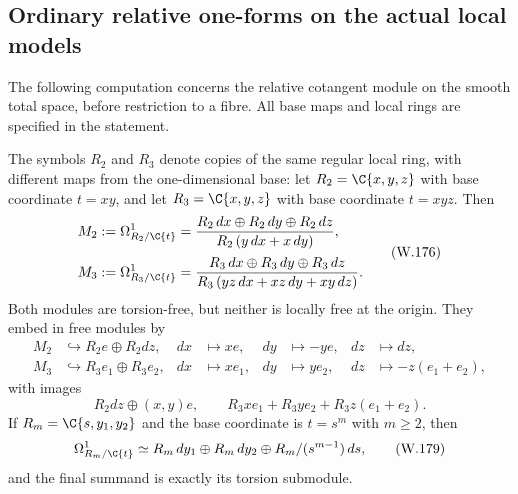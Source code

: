 \subsection{Ordinary relative one-forms on the actual local models}
The following computation concerns the relative cotangent module on the
smooth total space, before restriction to a fibre. All base maps and local
rings are specified in the statement.
\begin{proposition}
\label{wbII:prop:relative-local}
The symbols $R_2$ and $R_3$ denote copies of the same regular local ring,
with different maps from the one-dimensional base:
let $R_2=\C\{x,y,z\}$ with base coordinate $t=xy$, and let
$R_3=\C\{x,y,z\}$ with base coordinate $t=xyz$.  Then
\[
\begin{aligned}
 M_2&:=\Omega^1_{R_2/\C\{t\}}
 =\frac{R_2\,dx\oplus R_2\,dy\oplus R_2\,dz}
        {R_2\,(y\,dx+x\,dy)},\\[2pt]
 M_3&:=\Omega^1_{R_3/\C\{t\}}
 =\frac{R_3\,dx\oplus R_3\,dy\oplus R_3\,dz}
        {R_3\,(yz\,dx+xz\,dy+xy\,dz)}.
\end{aligned}
\tag{W.176}\label{wbII:eq:CN:6.1}
\]
Both modules are torsion-free, but neither is locally free at the origin.
They embed in free modules by
\[
\begin{aligned}
 M_2&\hookrightarrow R_2e\oplus R_2dz,
 &dx&\longmapsto xe,&dy&\longmapsto-ye,&dz&\longmapsto dz,\\
 M_3&\hookrightarrow R_3e_1\oplus R_3e_2,
 &dx&\longmapsto xe_1,&dy&\longmapsto ye_2,&dz&\longmapsto-z(e_1+e_2),
\end{aligned}
\tag{W.177}\label{wbII:eq:CN:6.2}
\]
with images
\[
 R_2dz\oplus (x,y)e,
 \qquad
 R_3xe_1+R_3ye_2+R_3z(e_1+e_2).
\tag{W.178}\label{wbII:eq:CN:6.3}
\]
If $R_m=\C\{s,y_1,y_2\}$ and the base coordinate is $t=s^m$ with
$m\ge2$, then
\[
\Omega^1_{R_m/\C\{t\}}
\simeq R_m\,dy_1\oplus R_m\,dy_2
       \oplus R_m/(s^{m-1})\,ds,
\tag{W.179}\label{wbII:eq:CN:6.4}
\]
and the final summand is exactly its torsion submodule.
\end{proposition}

